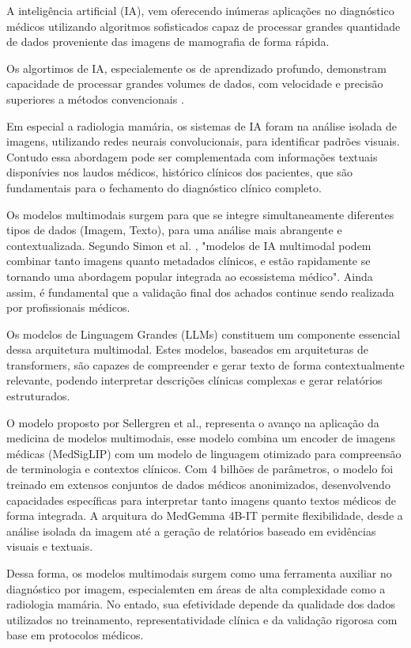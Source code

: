 \documentclass[10pt,conference]{IEEEtran}
\begin{document}
A inteligência artificial (IA), vem oferecendo inúmeras aplicações no diagnóstico médicos utilizando algoritmos sofisticados capaz de processar grandes quantidade de dados proveniente das imagens de mamografia de forma rápida.

Os algortimos de IA, especialemente os de aprendizado profundo, demonstram capacidade de processar grandes volumes de dados, com velocidade e precisão superiores a métodos convencionais \cite{hosny2018ai}.

Em especial a radiologia mamária, os sistemas de IA foram na análise isolada de imagens, utilizando redes neurais convolucionais, para identificar padrões visuais. Contudo essa abordagem pode ser complementada com informações textuais disponívies nos laudos médicos, histórico clínicos dos pacientes, que são fundamentais para o fechamento do diagnóstico clínico completo.

Os modelos multimodais surgem para que se integre simultaneamente diferentes tipos de dados (Imagem, Texto), para uma análise mais abrangente e contextualizada. Segundo Simon et al. \cite{simon2025multimodal}, "modelos de IA multimodal podem combinar tanto imagens quanto metadados clínicos, e estão rapidamente se tornando uma abordagem popular integrada ao ecossistema médico". Ainda assim, é fundamental que a validação final dos achados continue sendo realizada por profissionais médicos.

Os modelos de Linguagem Grandes (LLMs) constituem um componente essencial dessa arquitetura multimodal. Estes modelos, baseados em arquiteturas de transformers, são capazes de compreender e gerar texto de forma contextualmente relevante, podendo interpretar descrições clínicas complexas e gerar relatórios estruturados.

O modelo proposto por Sellergren et al.\cite{sellergren2025medgemma}, representa o avanço na aplicação da medicina de modelos multimodais, esse modelo combina um encoder de imagens médicas (MedSigLIP) com um modelo de linguagem otimizado para compreensão de terminologia e contextos clínicos. Com 4 bilhões de parâmetros, o modelo foi treinado em extensos conjuntos de dados médicos anonimizados, desenvolvendo capacidades específicas para interpretar tanto imagens quanto textos médicos de forma integrada. A arquitura do MedGemma 4B-IT permite flexibilidade, desde a análise isolada da imagem até a geração de relatórios baseado em evidências visuais e textuais.

Dessa forma, os modelos multimodais surgem como uma ferramenta auxiliar no diagnóstico por imagem, especialemten em áreas de alta complexidade como a radiologia mamária. No entado, sua efetividade depende da qualidade dos dados utilizados no treinamento, representatividade clínica e da validação rigorosa com base em protocolos médicos.
\end{document}
